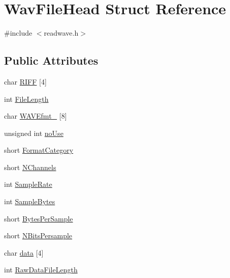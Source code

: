 \hypertarget{struct_wav_file_head}{\section{Wav\+File\+Head Struct Reference}
\label{struct_wav_file_head}
}


{\ttfamily \#include $<$readwave.\+h$>$}

\subsection*{Public Attributes}
\begin{DoxyCompactItemize}
\item 
char \hyperlink{struct_wav_file_head_a4fc167b57b0ce929d637c80beed7744e}{R\+I\+F\+F} \mbox{[}4\mbox{]}
\item 
int \hyperlink{struct_wav_file_head_af6ef4db041f48976098aea1b5bfcb68d}{File\+Length}
\item 
char \hyperlink{struct_wav_file_head_a14e02b5fba8c5e393d8bcd11152a1608}{W\+A\+V\+Efmt\+\_\+} \mbox{[}8\mbox{]}
\item 
unsigned int \hyperlink{struct_wav_file_head_a1dbfbc68c621ff888f8688b63398645a}{no\+Use}
\item 
short \hyperlink{struct_wav_file_head_ad2e87eeaa789bfdf22f4e9c9ff2e7b07}{Format\+Category}
\item 
short \hyperlink{struct_wav_file_head_ad73e25704b5cc8d830bdf5caea5804e8}{N\+Channels}
\item 
int \hyperlink{struct_wav_file_head_abf17ddae26fc3f08a43159f028ccb4dc}{Sample\+Rate}
\item 
int \hyperlink{struct_wav_file_head_a73329077c42d2cdd022a0d7af9338a3c}{Sample\+Bytes}
\item 
short \hyperlink{struct_wav_file_head_afca43e14ff9fe31b11a3e910efcb8cbd}{Bytes\+Per\+Sample}
\item 
short \hyperlink{struct_wav_file_head_a9c042585c539b80150b573589c4eca7d}{N\+Bits\+Persample}
\item 
char \hyperlink{struct_wav_file_head_aa176c0476558590c61248fcf88f4a93e}{data} \mbox{[}4\mbox{]}
\item 
int \hyperlink{struct_wav_file_head_ae8390a61beb394f87c67e2734996a2cf}{Raw\+Data\+File\+Length}
\end{DoxyCompactItemize}


